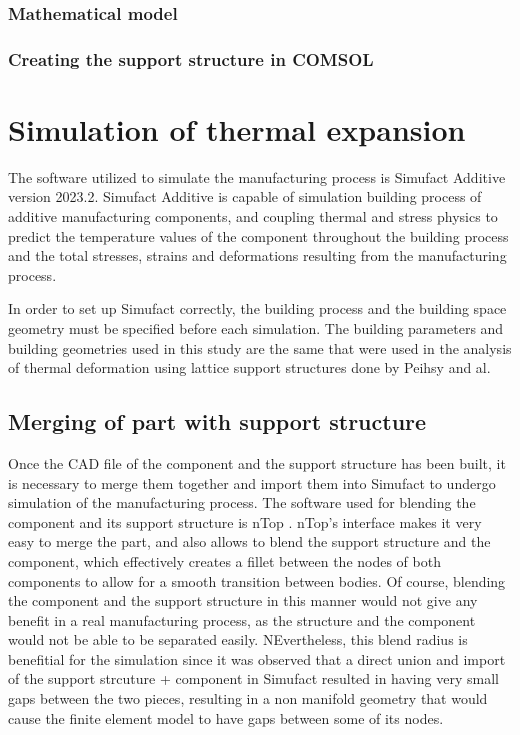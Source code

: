 \documentclass{article}
\begin{document}
\subsubsection{Mathematical model}

\subsubsection{Creating the support structure in COMSOL}



\section{Simulation of thermal expansion}


The software utilized to simulate the manufacturing process is Simufact Additive version 2023.2. Simufact Additive is capable of simulation building process of additive manufacturing components, and coupling thermal and stress physics to predict the temperature values of the component throughout the building process and the total stresses, strains and deformations resulting from the manufacturing process. 

In order to set up Simufact correctly, the building process and the building space geometry must be specified before each simulation. The building parameters and building geometries used in this study are the same that were used in the analysis of thermal deformation using lattice support structures done by Peihsy and al. 

\subsection{Merging of part with support structure}

Once the CAD file of the component and the support structure has been built, it is necessary to merge them together and import them into Simufact to undergo simulation of the manufacturing process. The software used for blending the component and its support structure is nTop . nTop's interface makes it very easy to merge the part, and also allows to blend the support structure and the component, which effectively creates a fillet between the nodes of both components to allow for a smooth transition between bodies. Of course, blending the component and the support structure in this manner would not give any benefit in a real manufacturing process, as the structure and the component would not be able to be separated easily. NEvertheless, this blend radius is benefitial for the simulation since it was observed that a direct union and import of the support strcuture + component in Simufact resulted in having very small gaps between the two pieces, resulting in a non manifold geometry that would cause the finite element model to have gaps between some of its nodes. 
\end{document}
